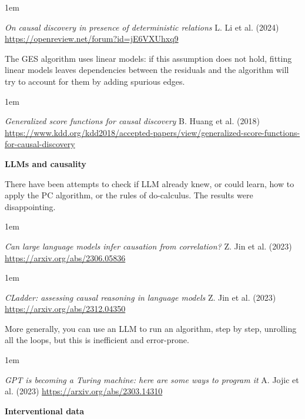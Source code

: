 \documentclass[a5paper]{article}
\newenvironment{reference}{%
  \medskip\goodbreak
  \parskip 0pt
  \raggedright
  \leftskip 1em
  \obeylines
}{\par\medskip\goodbreak}
\def\subsection#1{{\par\bigskip\goodbreak\large\bfseries #1\par}}
\begin{document}
\begin{reference}
  \emph{On causal discovery  in presence of deterministic relations}
  L. Li et al. (2024)
  \url{https://openreview.net/forum?id=jE6VXUhxq9}
\end{reference}

The GES algorithm uses linear models: if this assumption does not hold,
fitting linear models leaves dependencies between the residuals
and the algorithm will try to account for them by adding spurious edges.

\begin{reference}
  \emph{Generalized score functions  for causal discovery}
  B. Huang et al. (2018)
  \url{https://www.kdd.org/kdd2018/accepted-papers/view/generalized-score-functions-for-causal-discovery}
\end{reference}

\subsection{LLMs and causality}

There have been attempts to check if LLM already knew, or could learn,
how to apply the PC algorithm, or the rules of do-calculus.
The results were disappointing.

\begin{reference}
  \emph{Can large language models  infer causation from correlation?}
  Z. Jin et al. (2023)
  \url{https://arxiv.org/abs/2306.05836}
\end{reference}

\begin{reference}
  \emph{CLadder: assessing causal reasoning  in language models}
  Z. Jin et al. (2023)
  \url{https://arxiv.org/abs/2312.04350}
\end{reference}

More generally, you can use an LLM to run an algorithm, step by step, unrolling all the loops,
but this is inefficient and error-prone.

\begin{reference}
  \emph{GPT is becoming a Turing machine:  here are some ways to program it}
  A. Jojic et al. (2023)
  \url{https://arxiv.org/abs/2303.14310}
\end{reference}

\subsection{Interventional data}
\end{document}
